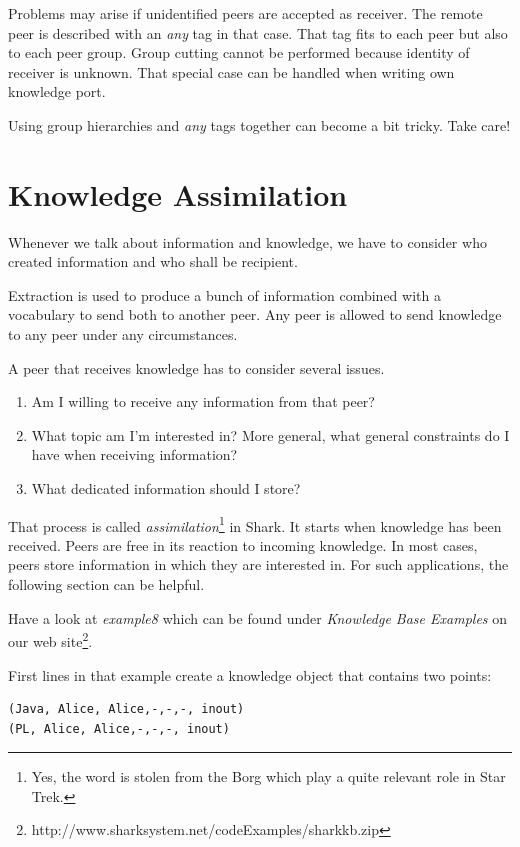 Problems may arise if unidentified peers are accepted as receiver. The remote peer is described with an {\it any} tag in that case. That tag fits to each peer but also to each peer group. Group cutting cannot be performed because identity of receiver is unknown. That special case can be handled when writing own knowledge port.

Using group hierarchies and {\it any} tags together can become a bit tricky. Take care!

\section{Knowledge Assimilation}
Whenever we talk about information and knowledge, we have to consider who created information and who shall be recipient.

Extraction is used to produce a bunch of information combined with a vocabulary to send both to another peer. Any peer is allowed to send knowledge to any peer under any circumstances.

A peer that receives knowledge has to consider several issues.

\begin{enumerate}
\item 
Am I willing to receive any information from that peer?
\item 
What topic am I'm interested in? More general, what general constraints do I have when receiving information?
\item 
What dedicated information should I store?
\end{enumerate}

That process is called {\it assimilation}\footnote{Yes, the word is stolen from the Borg which play a quite relevant role in Star Trek.} in Shark. It starts when knowledge has been received. Peers are free in its reaction to incoming knowledge. In most cases, peers store information in which they are interested in. For such applications, the following section can be helpful.

Have a look at {\it example8} which can be found under {\it Knowledge Base Examples} on our web 
site\footnote{http://www.sharksystem.net/codeExamples/sharkkb.zip}.

First lines in that example create a knowledge object that contains 
two points:

\begin{verbatim}
(Java, Alice, Alice,-,-,-, inout)
(PL, Alice, Alice,-,-,-, inout)
\end{verbatim}

